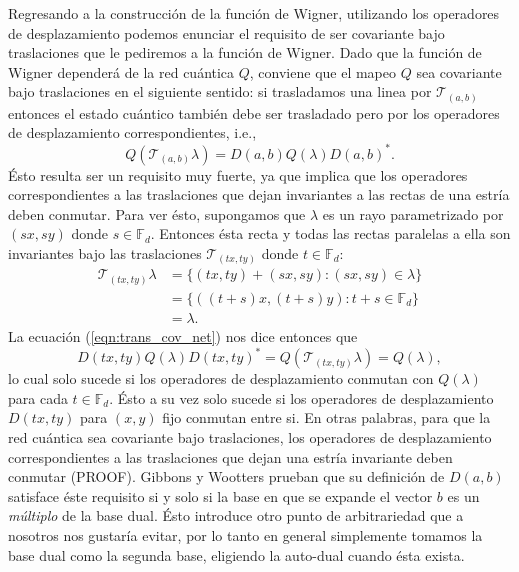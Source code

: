\documentclass[a4paper]{report}
\begin{document}
  Regresando a la construcción de la función de Wigner,
  utilizando los operadores de desplazamiento podemos
  enunciar el requisito de ser covariante bajo traslaciones
  que le pediremos a la función de Wigner. Dado que la
  función de Wigner dependerá de la red cuántica $Q$,
  conviene que el mapeo $Q$ sea covariante bajo traslaciones
  en el siguiente sentido: si trasladamos una linea por
  $\mathcal T_{(a,b)}$ entonces el estado cuántico también
  debe ser trasladado pero por los operadores de
  desplazamiento correspondientes, i.e.,
  \begin{equation}
    \label{eqn:trans_cov_net}
    Q(\mathcal T_{(a,b)} \lambda)
    = D(a,b) Q(\lambda) D(a,b)^{*}.
  \end{equation}
  Ésto resulta ser un requisito muy fuerte, ya que implica
  que los operadores correspondientes a las traslaciones que
  dejan invariantes a las rectas de una estría deben
  conmutar. Para ver ésto, supongamos que $\lambda$ es un
  rayo parametrizado por $(sx,sy)$ donde $s \in \mathbb
  F_d$. Entonces ésta recta y todas las rectas paralelas a
  ella son invariantes bajo las traslaciones $\mathcal
  T_{(tx,ty)}$ donde $t \in \mathbb F_d$:
  \begin{align*}
    \mathcal T_{(tx,ty)} \lambda
    &= \{(tx,ty) + (sx,sy) : (sx,sy) \in \lambda \} \\
    &= \{((t+s)x, (t+s)y) : t+s \in \mathbb F_d \}\\
    &= \lambda.
  \end{align*} 
  La ecuación (\ref{eqn:trans_cov_net}) nos dice entonces
  que
  \[
    D(tx,ty) Q(\lambda) D(tx,ty)^{*}
    = Q(\mathcal T_{(tx,ty)}\lambda)
    = Q(\lambda),
  \] 
  lo cual solo sucede si los operadores de desplazamiento
  conmutan con $Q(\lambda)$ para cada $t \in \mathbb F_d$.
  Ésto a su vez solo sucede si los operadores de
  desplazamiento $D(tx,ty)$ para $(x,y)$ fijo conmutan entre
  si. En otras palabras, para que la red cuántica sea
  covariante bajo traslaciones, los operadores de
  desplazamiento correspondientes a las traslaciones que
  dejan una estría invariante deben conmutar (PROOF).
  Gibbons y Wootters prueban que su definición de $D(a,b)$
  satisface éste requisito si y solo si la base en que se
  expande el vector $b$ es un \textit{múltiplo} de la base
  dual. Ésto introduce otro punto de arbitrariedad que a
  nosotros nos gustaría evitar, por lo tanto en general
  simplemente tomamos la base dual como la segunda base,
  eligiendo la auto-dual cuando ésta exista.
\end{document}
